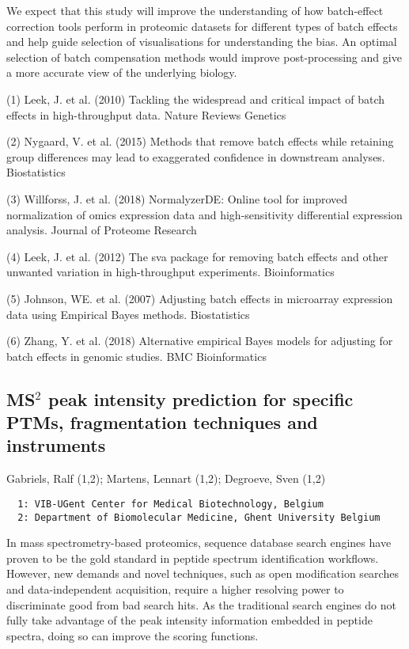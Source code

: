 {We expect that this study will improve the understanding of how batch-effect correction tools perform in proteomic datasets for different types of batch effects and help guide selection of visualisations for understanding the bias. An optimal selection of batch compensation methods would improve post-processing and give a more accurate view of the underlying biology.

(1) Leek, J. et al. (2010) Tackling the widespread and critical impact of batch effects in high-throughput data. Nature Reviews Genetics

(2) Nygaard, V. et al. (2015) Methods that remove batch effects while retaining group differences may lead to exaggerated confidence in downstream analyses. Biostatistics

(3) Willforss, J. et al. (2018) NormalyzerDE: Online tool for improved normalization of omics expression data and high-sensitivity differential expression analysis. Journal of Proteome Research

(4) Leek, J. et al. (2012) The sva package for removing batch effects and other unwanted variation in high-throughput experiments. Bioinformatics

(5) Johnson, WE. et al. (2007) Adjusting batch effects in microarray expression data using Empirical Bayes methods. Biostatistics

(6) Zhang, Y. et al. (2018) Alternative empirical Bayes models for adjusting for batch effects in genomic studies. BMC Bioinformatics


\subsection*{\color{eubicRed} MS$^2$ peak intensity prediction for specific PTMs, fragmentation techniques and instruments}
{\color{eubicGray}Gabriels, Ralf (1,2);
Martens, Lennart (1,2);
Degroeve, Sven (1,2)}
{\color{eubicGray}\begin{verbatim}
  1: VIB-UGent Center for Medical Biotechnology, Belgium
  2: Department of Biomolecular Medicine, Ghent University Belgium
\end{verbatim}}

In mass spectrometry-based proteomics, sequence database search engines have proven to be the gold standard in peptide spectrum identification workflows. However, new demands and novel techniques, such as open modification searches and data-independent acquisition, require a higher resolving power to discriminate good from bad search hits. As the traditional search engines do not fully take advantage of the peak intensity information embedded in peptide spectra, doing so can improve the scoring functions.

}
